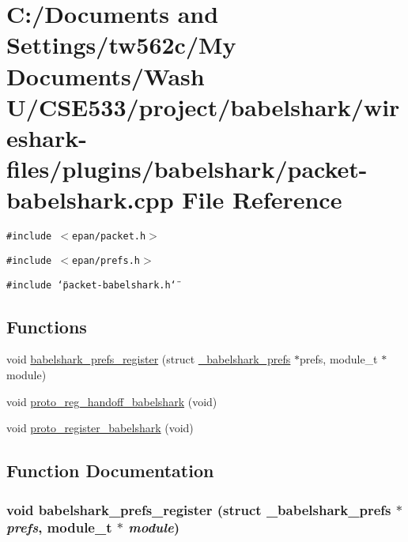 \hypertarget{packet-babelshark_8cpp}{
\section{C:/Documents and Settings/tw562c/My Documents/Wash U/CSE533/project/babelshark/wireshark-files/plugins/babelshark/packet-babelshark.cpp File Reference}
\label{packet-babelshark_8cpp}
}
{\tt \#include $<$epan/packet.h$>$}\par
{\tt \#include $<$epan/prefs.h$>$}\par
{\tt \#include \char`\"{}packet-babelshark.h\char`\"{}}\par
\subsection*{Functions}
\begin{CompactItemize}
\item 
void \hyperlink{packet-babelshark_8cpp_a7da879121dfba7477ae8adae7edf144}{babelshark\_\-prefs\_\-register} (struct \hyperlink{struct__babelshark__prefs}{\_\-babelshark\_\-prefs} $\ast$prefs, module\_\-t $\ast$module)
\item 
void \hyperlink{packet-babelshark_8cpp_05f79f4658db9ccfb4172678458b2d21}{proto\_\-reg\_\-handoff\_\-babelshark} (void)
\item 
void \hyperlink{packet-babelshark_8cpp_da335c2a9b50ba9605c8a5bd5209e50e}{proto\_\-register\_\-babelshark} (void)
\end{CompactItemize}


\subsection{Function Documentation}
\hypertarget{packet-babelshark_8cpp_a7da879121dfba7477ae8adae7edf144}{
\subsubsection[{babelshark\_\-prefs\_\-register}]{\setlength{\rightskip}{0pt plus 5cm}void babelshark\_\-prefs\_\-register (struct {\bf \_\-babelshark\_\-prefs} $\ast$ {\em prefs}, \/  module\_\-t $\ast$ {\em module})}}
\label{packet-babelshark_8cpp_a7da879121dfba7477ae8adae7edf144}


